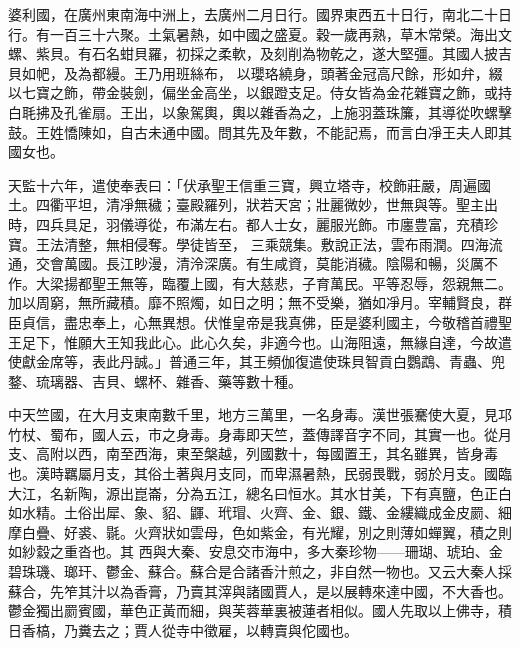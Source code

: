 \begin{pinyinscope}
 婆利國，在廣州東南海中洲上，去廣州二月日行。國界東西五十日行，南北二十日行。有一百三十六聚。土氣暑熱，如中國之盛夏。穀一歲再熟，草木常榮。海出文螺、紫貝。有石名蚶貝羅，初採之柔軟，及刻削為物乾之，遂大堅彊。其國人披吉貝如帊，及為都縵。王乃用班絲布，
 以瓔珞繞身，頭著金冠高尺餘，形如弁，綴以七寶之飾，帶金裝劍，偏坐金高坐，以銀蹬支足。侍女皆為金花雜寶之飾，或持白毦拂及孔雀扇。王出，以象駕輿，輿以雜香為之，上施羽蓋珠簾，其導從吹螺擊鼓。王姓憍陳如，自古未通中國。問其先及年數，不能記焉，而言白凈王夫人即其國女也。



 天監十六年，遣使奉表曰：「伏承聖王信重三寶，興立塔寺，校飾莊嚴，周遍國土。四衢平坦，清凈無穢；臺殿羅列，狀若天宮；壯麗微妙，世無與等。聖主出時，四兵具足，羽儀導從，布滿左右。都人士女，麗服光飾。市廛豊富，充積珍寶。王法清整，無相侵奪。學徒皆至，
 三乘競集。敷說正法，雲布雨潤。四海流通，交會萬國。長江眇漫，清泠深廣。有生咸資，莫能消穢。陰陽和暢，災厲不作。大梁揚都聖王無等，臨覆上國，有大慈悲，子育萬民。平等忍辱，怨親無二。加以周窮，無所藏積。靡不照燭，如日之明；無不受樂，猶如凈月。宰輔賢良，群臣貞信，盡忠奉上，心無異想。伏惟皇帝是我真佛，臣是婆利國主，今敬稽首禮聖王足下，惟願大王知我此心。此心久矣，非適今也。山海阻遠，無緣自達，今故遣使獻金席等，表此丹誠。」普通三年，其王頻伽復遣使珠貝智貢白鸚鵡、青蟲、兜鍪、琉璃器、吉貝、螺杯、雜香、藥等數十種。



 中天竺國，在大月支東南數千里，地方三萬里，一名身毒。漢世張騫使大夏，見邛竹杖、蜀布，國人云，市之身毒。身毒即天竺，蓋傳譯音字不同，其實一也。從月支、高附以西，南至西海，東至槃越，列國數十，每國置王，其名雖異，皆身毒也。漢時羈屬月支，其俗土著與月支同，而卑濕暑熱，民弱畏戰，弱於月支。國臨大江，名新陶，源出崑崙，分為五江，總名曰恒水。其水甘美，下有真鹽，色正白如水精。土俗出犀、象、貂、鼲、玳瑁、火齊、金、銀、鐵、金縷織成金皮罽、細摩白疊、好裘、毾。火齊狀如雲母，色如紫金，有光耀，別之則薄如蟬翼，積之則如紗縠之重沓也。其
 西與大秦、安息交市海中，多大秦珍物——珊瑚、琥珀、金碧珠璣、瑯玕、鬱金、蘇合。蘇合是合諸香汁煎之，非自然一物也。又云大秦人採蘇合，先笮其汁以為香膏，乃賣其滓與諸國賈人，是以展轉來達中國，不大香也。鬱金獨出罽賓國，華色正黃而細，與芙蓉華裏被蓮者相似。國人先取以上佛寺，積日香槁，乃糞去之；賈人從寺中徵雇，以轉賣與佗國也。




\end{pinyinscope}
